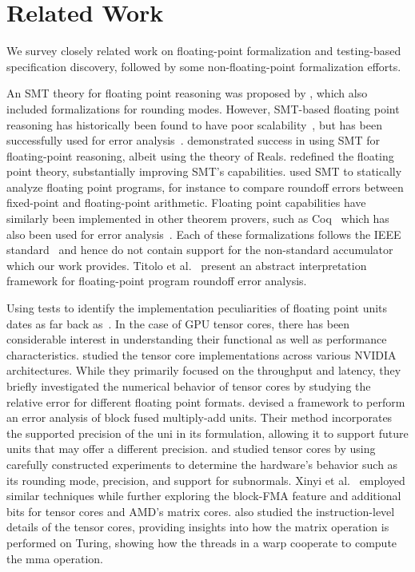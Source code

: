 \section{Related Work}
\label{sec:relwork}
We survey closely related work on floating-point formalization and testing-based specification discovery, followed by some non-floating-point formalization efforts.

An SMT theory for floating point reasoning was proposed by \citet{rummer2010smt}, which also included formalizations for rounding modes.  However, SMT-based floating point reasoning has historically been found to have poor scalability~\cite{darulova2014sound,schkufza2014stochastic}, but has been successfully used for error analysis~\cite{solovyev2018rigorous}. \citet{leeser2014make} demonstrated success in using SMT for floating-point reasoning, albeit using the theory of Reals.  \citet{martin2015automatable} redefined the floating point theory, substantially improving SMT's capabilities.  \citet{darulova2018daisy} used SMT to statically analyze floating point programs, for instance to compare roundoff errors between fixed-point and floating-point arithmetic. Floating point capabilities have similarly been implemented in other theorem provers, such as Coq~\cite{2011flcoq} which has also been used for error analysis~\cite{appel2024vcfloat2}. Each of these formalizations follows the IEEE standard~\cite{ieee-754-2008} and hence do not contain support for the non-standard accumulator which our work provides.
Titolo et al.~\cite{laura-titolo-munoz-vmcai} present an abstract interpretation framework for floating-point program roundoff error analysis.

Using tests to identify the implementation peculiarities of floating point units dates as far back as~\citet{paranoia}.  
In the case of GPU tensor cores, there has been considerable interest in understanding their functional as well as performance characteristics. \citet{sun2022dissecting} studied the tensor core implementations across various NVIDIA architectures.  While they primarily focused on the throughput and latency, they briefly investigated the numerical behavior of tensor cores by studying the relative error for different floating point formats. \citet{blanchard2020mixed} devised a framework to perform an error analysis of block fused multiply-add units.  Their method incorporates the supported precision of the uni in its formulation, allowing it to support future units that may offer a different precision. \citet{Hickmann2019ExperimentalAO} and \citet{fasi2021numerical} studied tensor cores by using carefully constructed experiments to determine the hardware's behavior such as its rounding mode, precision, and support for subnormals. Xinyi et al.~\cite{xinyili24} employed similar techniques while further exploring the block-FMA feature and additional bits for tensor cores and AMD's matrix cores.  \citet{yan2020demystifying} also studied the instruction-level details of the tensor cores, providing insights into how the matrix operation is performed on Turing, showing how the threads in a warp cooperate to compute the mma operation.

